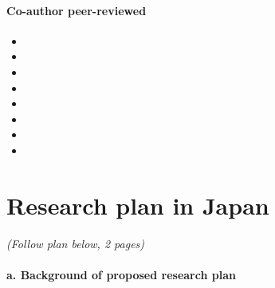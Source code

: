 \documentclass{article}
\begin{document}
\paragraph{Co-author peer-reviewed}

    \begin{itemize}
      \item{}
      \item{}
      \item{}
      \item{}
      \item{}
      \item{}
      \item{}
      \item{}
    \end{itemize}


\section{Research plan in Japan}

    \emph{(Follow plan below, 2 pages)}

\paragraph{a. Background of proposed research plan}
\end{document}
